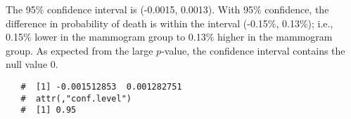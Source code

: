 \documentclass[letterpaper,12pt,twoside,]{pinp}
\begin{document}
\begin{enumerate}
\begin{enumerate}
    The 95\% confidence interval is (-0.0015, 0.0013). With 95\%
    confidence, the difference in probability of death is within the
    interval (-0.15\%, 0.13\%); i.e., 0.15\% lower in the mammogram
    group to 0.13\% higher in the mammogram group. As expected from the
    large \(p\)-value, the confidence interval contains the null value
    0.

    \color{black}
  \end{enumerate}

\begin{Shaded}
\begin{Highlighting}[]
\NormalTok{(}\OperatorTok{$}
\end{Highlighting}
\end{Shaded}

  \begin{ShadedResult}
   \begin{verbatim}
   #  [1] -0.001512853  0.001282751
   #  attr(,"conf.level")
   #  [1] 0.95
   \end{verbatim}
   \end{ShadedResult}
\end{enumerate}

\newpage
\end{document}
